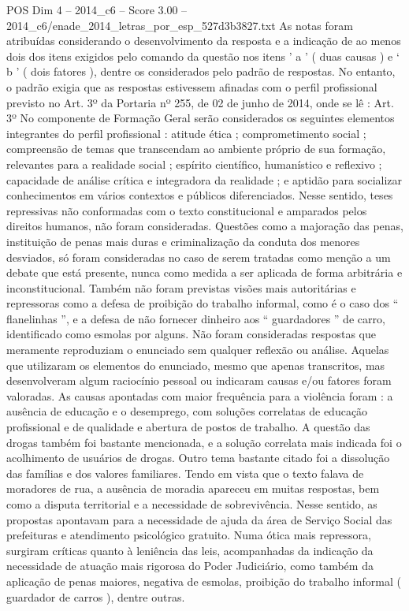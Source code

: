 \begin{textsample}{POS Dim 4 – 2014\_c6 – Score 3.00 – 2014\_c6/enade\_2014\_letras\_por\_esp\_527d3b3827.txt}
As notas foram atribuídas considerando o desenvolvimento da resposta e a indicação de ao menos dois dos itens exigidos pelo comando da questão nos itens ’ a ’ ( duas causas ) e ‘ b ’ ( dois fatores ), dentre os considerados pelo padrão de respostas.
No entanto, o padrão exigia que as respostas estivessem afinadas com o perfil profissional previsto no Art. 3º da Portaria nº 255, de 02 de junho de 2014, onde se lê : Art. 3º No componente de Formação Geral serão considerados os seguintes elementos integrantes do perfil profissional : atitude ética ; comprometimento social ; compreensão de temas que transcendam ao ambiente próprio de sua formação, relevantes para a realidade social ; espírito científico, humanístico e reflexivo ; capacidade de análise crítica e integradora da realidade ; e aptidão para socializar conhecimentos em vários contextos e públicos diferenciados.
Nesse sentido, teses repressivas não conformadas com o texto constitucional e amparados pelos direitos humanos, não foram consideradas.
Questões como a majoração das penas, instituição de penas mais duras e criminalização da conduta dos menores desviados, só foram consideradas no caso de serem tratadas como menção a um debate que está presente, nunca como medida a ser aplicada de forma arbitrária e inconstitucional.
Também não foram previstas visões mais autoritárias e repressoras como a defesa de proibição do trabalho informal, como é o caso dos “ flanelinhas ”, e a defesa de não fornecer dinheiro aos “ guardadores ” de carro, identificado como esmolas por alguns.
Não foram consideradas respostas que meramente reproduziam o enunciado sem qualquer reflexão ou análise.
Aquelas que utilizaram os elementos do enunciado, mesmo que apenas transcritos, mas desenvolveram algum raciocínio pessoal ou indicaram causas e/ou fatores foram valoradas.
As causas apontadas com maior frequência para a violência foram : a ausência de educação e o desemprego, com soluções correlatas de educação profissional e de qualidade e abertura de postos de trabalho.
A questão das drogas também foi bastante mencionada, e a solução correlata mais indicada foi o acolhimento de usuários de drogas.
Outro tema bastante citado foi a dissolução das famílias e dos valores familiares.
Tendo em vista que o texto falava de moradores de rua, a ausência de moradia apareceu em muitas respostas, bem como a disputa territorial e a necessidade de sobrevivência.
Nesse sentido, as propostas apontavam para a necessidade de ajuda da área de Serviço Social das prefeituras e atendimento psicológico gratuito.
Numa ótica mais repressora, surgiram críticas quanto à leniência das leis, acompanhadas da indicação da necessidade de atuação mais rigorosa do Poder Judiciário, como também da aplicação de penas maiores, negativa de esmolas, proibição do trabalho informal ( guardador de carros ), dentre outras.

\end{textsample}
